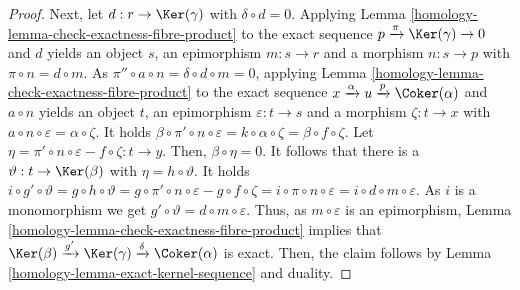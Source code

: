 \begin{proof}
\medskip\noindent
Next, let $d : r \to \Ker(\gamma)$ with $\delta \circ d = 0$. Applying
Lemma \ref{homology-lemma-check-exactness-fibre-product} to the exact sequence
$p \xrightarrow{\pi} \Ker(\gamma) \to 0$ and $d$ yields an object $s$,
an epimorphism $m : s \to r$ and a morphism $n : s \to p$ with
$\pi \circ n = d \circ m$. As
$\pi'' \circ a \circ n = \delta \circ d \circ m = 0$,
applying Lemma \ref{homology-lemma-check-exactness-fibre-product} to the exact sequence
$x \xrightarrow{\alpha} u \xrightarrow{p} \Coker(\alpha)$ and
$a \circ n$ yields an object $t$, an epimorphism $\varepsilon : t \to s$ and
a morphism $\zeta : t \to x$ with
$a \circ n \circ \varepsilon = \alpha \circ \zeta$.
It holds
$\beta \circ \pi' \circ n \circ \varepsilon =
k \circ \alpha \circ \zeta = \beta \circ f \circ \zeta$.
Let $\eta = \pi' \circ n \circ \varepsilon - f \circ \zeta : t \to y$. Then,
$\beta \circ \eta = 0$. It follows that there is a
$\vartheta : t \to \Ker(\beta)$ with $\eta = h \circ \vartheta$. It holds
$i \circ g' \circ \vartheta = g \circ h \circ \vartheta =
g \circ \pi' \circ n \circ \varepsilon - g \circ f \circ \zeta =
i \circ \pi \circ n \circ \varepsilon = i \circ d \circ m \circ \varepsilon$.
As $i$ is a monomorphism we get
$g' \circ \vartheta = d \circ m \circ \varepsilon$.
Thus, as $m \circ \varepsilon$ is an epimorphism,
Lemma \ref{homology-lemma-check-exactness-fibre-product} implies that
$\Ker(\beta) \xrightarrow{g'} \Ker(\gamma) \xrightarrow{\delta} \Coker(\alpha)$
is exact. Then, the claim follows by Lemma \ref{homology-lemma-exact-kernel-sequence}
and duality.
\end{proof}

